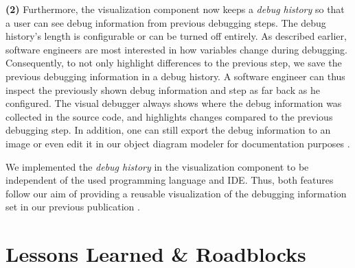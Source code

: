 \documentclass[sigconf]{acmart}
\begin{document}
\textbf{(2)} Furthermore, the visualization component now keeps a \textit{debug history} so that a user can see debug information from previous debugging steps.
The debug history's length is configurable or can be turned off entirely.
As described earlier, software engineers are most interested in how variables change during debugging.
Consequently, to not only highlight differences to the previous step, we save the previous debugging information in a debug history.
A software engineer can thus inspect the previously shown debug information and step as far back as he configured.
The visual debugger always shows where the debug information was collected in the source code, and highlights changes compared to the previous debugging step.
In addition, one can still export the debug information to an image or even edit it in our object diagram modeler \cite{timkrauterObjectdiagramjs2023} for documentation purposes \cite{krauterVisualDebuggerTool2022}.

We implemented the \textit{debug history} in the visualization component to be independent of the used programming language and IDE.
Thus, both features follow our aim of providing a reusable visualization of the debugging information set in our previous publication \cite{krauterVisualDebuggerTool2022}.

\section{Lessons Learned \& Roadblocks} \label{sec:lessonsLearned}



\end{document}
